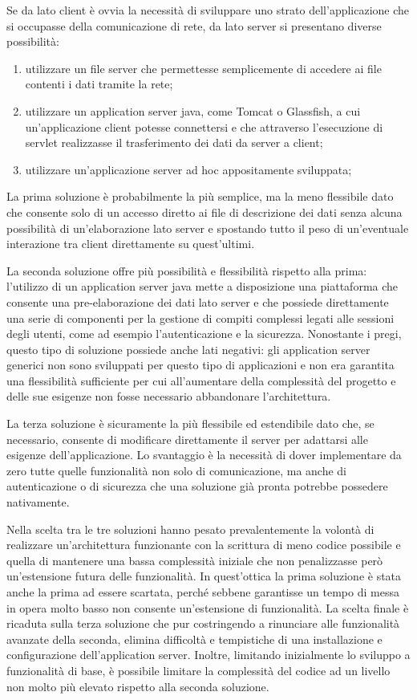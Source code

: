 Se da lato client \`e ovvia la necessit\`a di sviluppare uno strato dell'applicazione che si occupasse della comunicazione di rete, da lato server si presentano diverse possibilit\`a: 
\begin{enumerate}
	\item  utilizzare un file server che permettesse semplicemente di accedere ai file contenti i dati tramite la rete;
	\item  utilizzare un application server java, come Tomcat o Glassfish, a cui un'applicazione client potesse connettersi e che attraverso l'esecuzione di servlet realizzasse il trasferimento dei dati da server a client;
	\item  utilizzare un'applicazione server ad hoc appositamente sviluppata;
\end{enumerate}

La prima soluzione \`e probabilmente la pi\`u semplice, ma la meno flessibile dato che consente solo di un accesso diretto ai file di descrizione dei dati senza alcuna possibilit\`a di un'elaborazione lato server e spostando tutto il peso di un'eventuale interazione tra client direttamente su quest'ultimi.

La seconda soluzione offre pi\`u possibilit\`a e flessibilit\`a rispetto alla prima: l'utilizzo di un application server java mette a disposizione una piattaforma che consente una pre-elaborazione dei dati lato server e che possiede direttamente una serie di componenti per la gestione di compiti complessi legati alle sessioni degli utenti, come ad esempio l'autenticazione e la sicurezza. Nonostante i pregi, questo tipo di soluzione possiede anche lati negativi: gli application server generici non sono sviluppati per questo tipo di applicazioni e non era garantita una flessibilit\`a sufficiente per cui all'aumentare della complessit\`a del progetto e delle sue esigenze non fosse necessario abbandonare l'architettura. 

La terza soluzione \`e sicuramente la pi\`u flessibile ed estendibile dato che, se necessario, consente di modificare direttamente il server per adattarsi alle esigenze dell'applicazione. Lo svantaggio \`e la necessit\`a di dover implementare da zero tutte quelle funzionalit\`a non solo di comunicazione, ma anche di autenticazione o di sicurezza che una soluzione gi\`a pronta potrebbe possedere nativamente.

Nella scelta tra le tre soluzioni hanno pesato prevalentemente la volont\`a di realizzare un'architettura funzionante con la scrittura di meno codice possibile e quella di mantenere una bassa complessit\`a iniziale che non penalizzasse per\`o un'estensione futura delle funzionalit\`a. In quest'ottica la prima soluzione è stata anche la prima ad essere scartata, perché sebbene garantisse un tempo di messa in opera molto basso non consente un'estensione di funzionalità. 
La scelta finale è ricaduta sulla terza soluzione che pur costringendo a rinunciare alle funzionalità avanzate della seconda, elimina difficoltà e tempistiche di una installazione e configurazione dell'application server. Inoltre, limitando inizialmente lo sviluppo a funzionalità di base, è possibile limitare la complessità del codice ad un livello non molto più elevato rispetto alla seconda soluzione.



